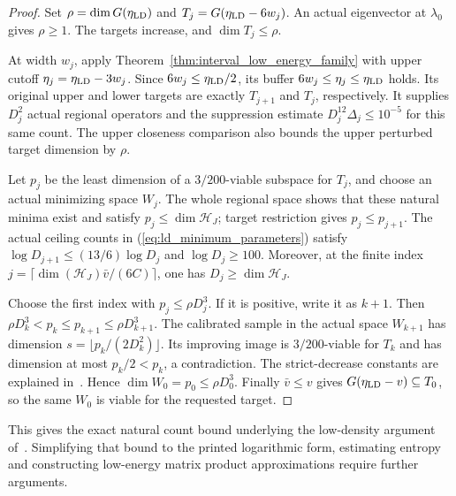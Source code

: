 \begin{proof}
    \leanok
    Set $\rho=\dim G(\eta_{\rm LD})$ and
    $T_j=G(\eta_{\rm LD}-6w_j)$. An actual eigenvector at
    $\lambda_0$ gives $\rho\ge1$. The targets increase, and
    $\dim T_j\le\rho$.

    At width $w_j$, apply Theorem~\ref{thm:interval_low_energy_family}
    with upper cutoff $\eta_j=\eta_{\rm LD}-3w_j$.
    Since $6w_j\le\eta_{\rm LD}/2$, its buffer
    $6w_j\le\eta_j\le\eta_{\rm LD}$ holds. Its original upper and
    lower targets are exactly $T_{j+1}$ and $T_j$, respectively.
    It supplies $D_j^2$ actual regional operators and the suppression
    estimate $D_j^{12}\Delta_j\le10^{-5}$ for this same count.
    The upper closeness comparison also bounds the upper perturbed
    target dimension by $\rho$.

    Let $p_j$ be the least dimension of a $3/200$-viable subspace
    for $T_j$, and choose an actual minimizing space $W_j$.
    The whole regional space shows that these natural minima exist
    and satisfy $p_j\le\dim\mathcal H_J$; target restriction gives
    $p_j\le p_{j+1}$. The actual ceiling counts in
    (\ref{eq:ld_minimum_parameters}) satisfy
    $\log D_{j+1}\le(13/6)\log D_j$ and $\log D_j\ge100$.
    Moreover, at the finite index
    $j=\lceil\dim(\mathcal H_J)\bar v/(6C)\rceil$,
    one has $D_j\ge\dim\mathcal H_J$.

    Choose the first index with $p_j\le\rho D_j^3$.
    If it is positive, write it as $k+1$. Then
    $\rho D_k^3<p_k\le p_{k+1}\le\rho D_{k+1}^3$.
    The calibrated sample in the actual space $W_{k+1}$ has dimension
    $s=\lfloor p_k/(2D_k^2)\rfloor$. Its improving image is
    $3/200$-viable for $T_k$ and has dimension at most
    $p_k/2<p_k$, a contradiction. The strict-decrease constants are
    explained in~\cite{gap:alvv16_low_density_sampling}.
    Hence $\dim W_0=p_0\le\rho D_0^3$.
    Finally $\bar v\le v$ gives
    $G(\eta_{\rm LD}-v)\subseteq T_0$, so the same $W_0$ is
    viable for the requested target.
\end{proof}

This gives the exact natural count bound underlying the low-density
argument of~\cite[Proposition~prop:albootstrap-ld,
    lines 1112--1128]{Arad2016RigorousRG}. Simplifying that bound to the
printed logarithmic form, estimating entropy and constructing low-energy
matrix product approximations require further arguments.
